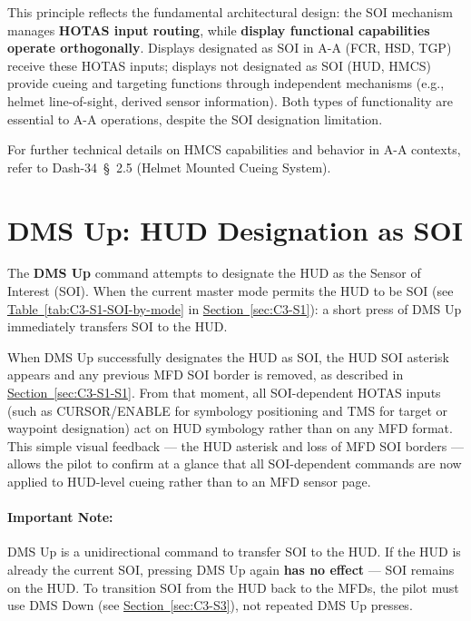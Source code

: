 \documentclass[11pt, a4paper, twoside]{report}
\newcommand{\dashref}[1]{Dash-34~\S~#1}
\newcommand{\secref}[1]{\hyperref[#1]{Section~\ref*{#1}}}
\newcommand{\tabref}[1]{\hyperref[#1]{Table~\ref*{#1}}}
\begin{document}
This principle reflects the fundamental architectural design: the SOI mechanism manages \textbf{HOTAS input routing}, while \textbf{display functional capabilities operate orthogonally}. Displays designated as SOI in A-A (FCR, HSD, TGP) receive these HOTAS inputs; displays not designated as SOI (HUD, HMCS) provide cueing and targeting functions through independent mechanisms (e.g., helmet line-of-sight, derived sensor information). Both types of functionality are essential to A-A operations, despite the SOI designation limitation.

For further technical details on HMCS capabilities and behavior in A-A contexts, refer to \dashref{2.5} (Helmet Mounted Cueing System).

\section{DMS Up: HUD Designation as SOI}
\label{sec:C3-S2}

The \textbf{DMS Up} command attempts to designate the HUD as the Sensor of Interest (SOI). When the current master mode permits the HUD to be SOI (see \tabref{tab:C3-S1-SOI-by-mode} in \secref{sec:C3-S1}): a short press of DMS Up immediately transfers SOI to the HUD.

When DMS Up successfully designates the HUD as SOI, the HUD SOI asterisk appears and any previous MFD SOI border is removed, as described in \secref{sec:C3-S1-S1}. From that moment, all SOI-dependent HOTAS inputs (such as CURSOR/ENABLE for symbology positioning and TMS for target or waypoint designation) act on HUD symbology rather than on any MFD format. This simple visual feedback --- the HUD asterisk and loss of MFD SOI borders --- allows the pilot to confirm at a glance that all SOI-dependent commands are now applied to HUD-level cueing rather than to an MFD sensor page.

\paragraph*{Important Note:}

DMS Up is a unidirectional command to transfer SOI to the HUD. If the HUD is already the current SOI, pressing DMS Up again \textbf{has no effect} --- SOI remains on the HUD. To transition SOI from the HUD back to the MFDs, the pilot must use DMS Down (see \secref{sec:C3-S3}), not repeated DMS Up presses.
\end{document}
